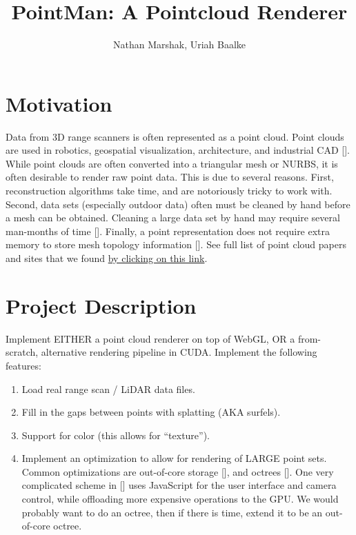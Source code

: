 \documentclass{article}
\begin{document}
\title{PointMan: A Pointcloud Renderer}
\author{Nathan Marshak, Uriah Baalke}
\maketitle
\section{Motivation}
Data from 3D range scanners is often represented as a point cloud. Point clouds are used in robotics, geospatial visualization, architecture, and industrial CAD []. While point clouds are often converted into a triangular mesh or NURBS, it is often desirable to render raw point data. This is due to several reasons. First, reconstruction algorithms take time, and are notoriously tricky to work with. Second, data sets (especially outdoor data) often must be cleaned by hand before a mesh can be obtained. Cleaning a large data set by hand may require several man-months of time []. Finally, a point representation does not require extra memory to store mesh topology information []. See full list of point cloud papers and sites that we found \href{https://docs.google.com/document/d/1H8QUlHV6Eg2A3o9CJMlEzgLDtrJm5CMsjRKsSs9GT_0/edit?usp=sharing}{by clicking on this link}.
\section{Project Description}
Implement EITHER a point cloud renderer on top of WebGL, OR a from-scratch, alternative rendering pipeline in CUDA. Implement the following features:
\begin{enumerate}
\item Load real range scan / LiDAR data files.
\item Fill in the gaps between points with splatting (AKA surfels).
\item Support for color (this allows for ``texture'').
\item Implement an optimization to allow for rendering of LARGE point sets. Common optimizations are out-of-core storage [], and octrees []. One very complicated scheme in [] uses JavaScript for the user interface and camera control, while offloading more expensive operations to the GPU. We would probably want to do an octree, then if there is time,
extend it to be an out-of-core octree. 
\end{enumerate}


\end{document}
